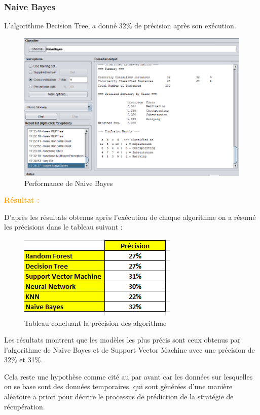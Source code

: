 \subsubsection{Naive Bayes}

L'algorithme Decision Tree, a donné 32\% de précision après son exécution.

\begin{figure}[H]
\begin{center}
\includegraphics[width=0.8\linewidth]{images/perfNB.PNG}
\end{center}
\caption{Performance de Naive Bayes}
\label{fig:21}
\end{figure}

\textcolor{Orange}{\textbf{Résultat :}} 

D'après les résultats obtenus après l'exécution de chaque algorithme on a résumé les précisions dans le tableau suivant : 

\begin{figure}[H]
\begin{center}
\includegraphics[width=0.6\linewidth]{images/stat.PNG}
\end{center}
\caption{Tableau concluant la précision des algorithme}
\label{fig:22}
\end{figure}

Les résultats montrent que les modèles les plus précis sont ceux obtenus par l'algorithme de Naive Bayes et  de Support Vector Machine avec une précision de 32\% et 31\%.

Cela reste une hypothèse comme cité au par avant car les données sur lesquelles on se base sont des données temporaires, qui sont générées d'une manière aléatoire a priori pour décrire le processus de prédiction de la stratégie de récupération. 

